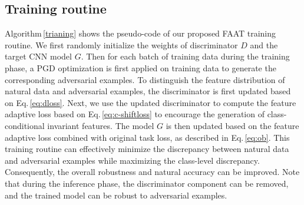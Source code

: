 \documentclass[10pt,twocolumn,letterpaper]{article}
\begin{document}
\subsection{Training routine}\label{sec:training}
Algorithm\,\ref{trianing} shows the pseudo-code of our proposed FAAT training routine. We first randomly initialize the weights of discriminator $D$ and the target CNN model $G$. Then for each batch of training data during the training phase, a PGD optimization is first applied on training data to generate the corresponding adversarial examples. To distinguish the feature distribution of natural data and adversarial examples, the discriminator is first updated based on Eq.\,\eqref{eq:dloss}. Next, we use the updated discriminator to compute the feature adaptive loss based on Eq.\,\eqref{eq:c-shiftloss} to encourage the generation of class-conditional invariant features. The model $G$ is then updated based on the feature adaptive loss combined with original task loss, as described in Eq.\,\eqref{eq:ob}. This training routine can effectively minimize the discrepancy between natural data and adversarial examples while maximizing the class-level discrepancy. Consequently, the overall robustness and natural accuracy can be improved. Note that during the inference phase, the discriminator component can be removed, and the trained model can be robust to adversarial examples.
\end{document}
